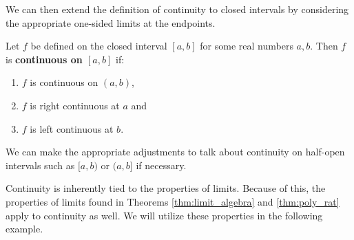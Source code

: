 We can then extend the definition of continuity to closed intervals by considering the appropriate one-sided limits at the endpoints.

\begin{definition}\label{def:closed_continuity}
Let $f$ be defined on the closed interval $[a,b]$ for some real numbers $a,b$. Then $f$ is \textbf{continuous on $[a,b]$} if:
\begin{enumerate}
	\item	$f$ is continuous on $(a,b)$,
	\item	$f$ is right continuous at $a$ and 
	\item	$f$ is left continuous at $b$.
\end{enumerate}
\end{definition}
		
We can make the appropriate adjustments to talk about continuity on half-open intervals such as $[a,b)$ or $(a,b]$ if necessary.\bigskip
%
%

Continuity is inherently tied to the properties of limits. Because of this, the properties of limits found in Theorems \ref{thm:limit_algebra} and \ref{thm:poly_rat}
apply to continuity as well. We will utilize these properties in the following example.


